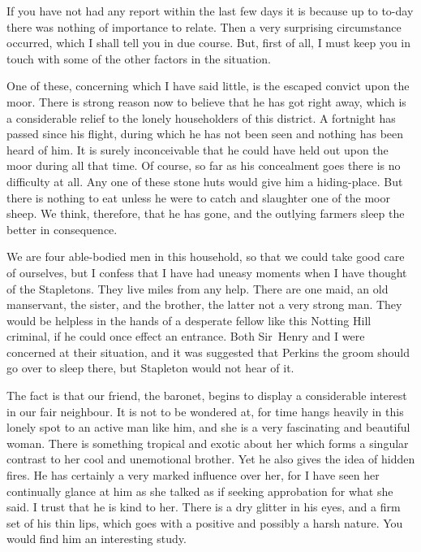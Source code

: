If you have not had any report within the last few days it is because up to to-day there was nothing of importance to relate. Then a very surprising circumstance occurred, which I shall tell you in due course. But, first of all, I must keep you in touch with some of the other factors in the situation.

One of these, concerning which I have said little, is the escaped convict upon the moor. There is strong reason now to believe that he has got right away, which is a considerable relief to the lonely householders of this district. A fortnight has passed since his flight, during which he has not been seen and nothing has been heard of him. It is surely inconceivable that he could have held out upon the moor during all that time. Of course, so far as his concealment goes there is no difficulty at all. Any one of these stone huts would give him a hiding-place. But there is nothing to eat unless he were to catch and slaughter one of the moor sheep. We think, therefore, that he has gone, and the outlying farmers sleep the better in consequence.

We are four able-bodied men in this household, so that we could take good care of ourselves, but I confess that I have had uneasy moments when I have thought of the Stapletons. They live miles from any help. There are one maid, an old manservant, the sister, and the brother, the latter not a very strong man. They would be helpless in the hands of a desperate fellow like this Notting Hill criminal, if he could once effect an entrance. Both Sir~Henry and I were concerned at their situation, and it was suggested that Perkins the groom should go over to sleep there, but Stapleton would not hear of it.

The fact is that our friend, the baronet, begins to display a considerable interest in our fair neighbour. It is not to be wondered at, for time hangs heavily in this lonely spot to an active man like him, and she is a very fascinating and beautiful woman. There is something tropical and exotic about her which forms a singular contrast to her cool and unemotional brother. Yet he also gives the idea of hidden fires. He has certainly a very marked influence over her, for I have seen her continually glance at him as she talked as if seeking approbation for what she said. I trust that he is kind to her. There is a dry glitter in his eyes, and a firm set of his thin lips, which goes with a positive and possibly a harsh nature. You would find him an interesting study.

